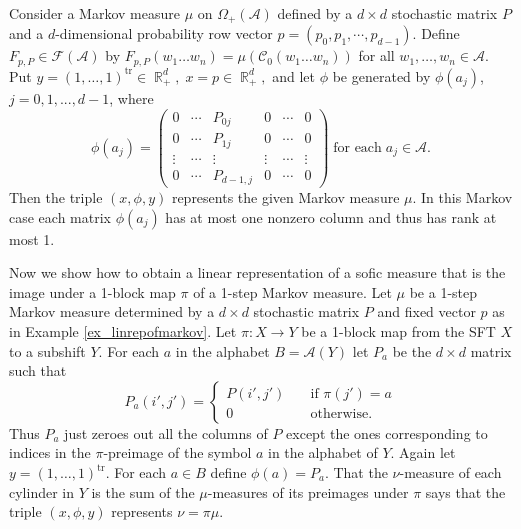 \documentclass{kepart2010}
\theoremstyle{plain}
\theoremstyle{definition}
\theoremstyle{remark}
\theoremstyle{definition}
\numberwithin{equation}{section}
\begin{document}
{
\begin{ex}\label{ex_linrepofmarkov}
 Consider a Markov measure $\mu$ on $\Omega_{+}({{\mathcal A}})$ defined by a $d
\times d$ stochastic matrix $P$ and a $d$-dimensional probability
row vector $p=(p_0, p_1, \cdots, p_{d-1})$. Define $F_{p,P} \in
{{\mathcal F}}({{\mathcal A}})$ by $F_{p,P}(w_1\dots w_n)=\mu({{\mathcal C}}_0(w_1 \dots w_n))$ for
all $w_1, \dots ,w_n \in {{\mathcal A}}$.
 Put
$y=(1, \dots ,1)^\text{tr} \in \operatorname{\mathbb R}_{+}^{d}, \; x=p \in \operatorname{\mathbb R}_{+}^{d},$
and let $\phi$ be generated by $\phi(a_{j})$, $j=0,1,...,d-1$, where
\begin{equation} \phi(a_{j})= \left(
\begin{matrix}
0   &   \cdots  & {P}_{0 j} &     0 & \cdots & 0\\
0   &   \cdots  &{P}_{1j} &       0 & \cdots & 0\\
\vdots  &   \cdots  &\vdots &     \vdots   & \cdots & \vdots\\
0   & \cdots        & {P}_{d-1,j}&    0   & \cdots & 0
\end{matrix}
\right) \; \text{for each} \; {a}_j \in {{\mathcal A}}. \end{equation} Then the triple
$(x, \phi , y)$ represents the given Markov measure $\mu$.
  In this Markov case each matrix $\phi(a_j)$ has at most one
  nonzero column and thus has rank at most 1.
\end{ex}
}

{
\begin{ex}\label{ex_linrepofsofic}
Now we show how to obtain a linear representation of a sofic measure
that is the image under a 1-block map $\pi$ of a 1-step Markov
measure. Let $\mu$ be a 1-step Markov measure determined by a $d
\times d$ stochastic matrix $P$ and fixed vector $p$ as in Example
\ref{ex_linrepofmarkov}. Let $\pi :X \to Y$ be a 1-block map from
the SFT $X$ to a subshift $Y$. For each $a$ in the alphabet
$B={{\mathcal A}}(Y)$ let $P_a$ be the $d \times d$ matrix such that \begin{equation}
P_a(i',j')=
\begin{cases}
P(i',j') &\quad\text{if } \pi(j')=a\\
0 &\quad\text{otherwise.}
\end{cases}
 \end{equation}
 Thus $P_a$ just zeroes out all the columns of $P$ except the ones
 corresponding to indices in the $\pi$-preimage of the symbol $a$ in the
 alphabet of $Y$.
 Again let $y=(1, \dots ,1)^\text{tr}$.
For each $a \in B$ define $\phi(a)=P_a$. That the $\nu$-measure of
each cylinder in $Y$ is the sum of the $\mu$-measures of its
preimages under $\pi$ says that
  the triple $(x,\phi,y)$
 represents $\nu=\pi\mu$.
   \end{ex}
}
\end{document}
